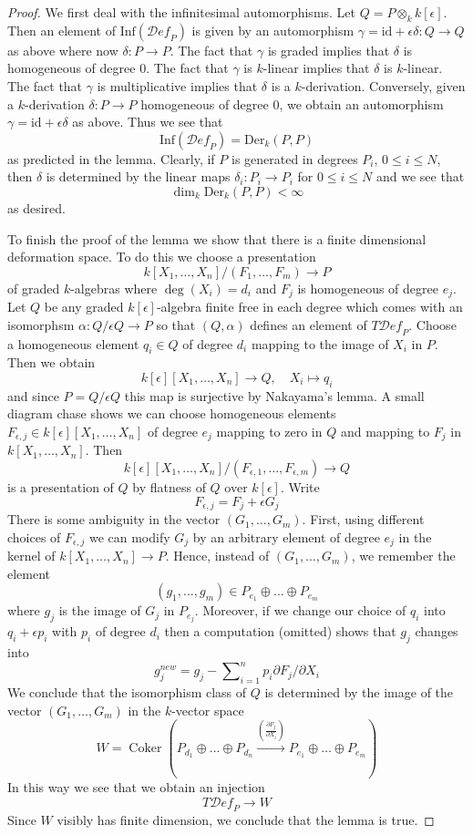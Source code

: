\documentclass[10pt,a4paper]{amsart}
\theoremstyle{plain}
\theoremstyle{definition}
\theoremstyle{remark}
\numberwithin{equation}{subsection}
\def\Coker{\mathop{\mathrm{Coker}}}
\def\Deformationcategory{\mathcal{D}\!\mathit{ef}}
\begin{document}
\begin{proof}
We first deal with the infinitesimal automorphisms.
Let $Q = P \otimes_k k[\epsilon]$.
Then an element of $\text{Inf}(\Deformationcategory_P)$
is given by an automorphism
$\gamma = \text{id} + \epsilon \delta : Q \to Q$
as above where now $\delta : P \to P$.
The fact that $\gamma$ is graded implies that
$\delta$ is homogeneous of degree $0$.
The fact that $\gamma$ is $k$-linear implies that
$\delta$ is $k$-linear.
The fact that $\gamma$ is multiplicative implies that
$\delta$ is a $k$-derivation.
Conversely, given a $k$-derivation $\delta : P \to P$
homogeneous of degree $0$, we obtain an automorphism
$\gamma = \text{id} + \epsilon \delta$ as above.
Thus we see that
$$
\text{Inf}(\Deformationcategory_P) = \text{Der}_k(P, P)
$$
as predicted in the lemma.
Clearly, if $P$ is generated in degrees $P_i$,
$0 \leq i \leq N$, then $\delta$ is determined by
the linear maps $\delta_i : P_i \to P_i$ for
$0 \leq i \leq N$ and we see that
$$
\dim_k \text{Der}_k(P, P) < \infty
$$
as desired.

\medskip\noindent
To finish the proof of the lemma we show that there is a finite
dimensional deformation space. To do this we
choose a presentation
$$
k[X_1, \ldots, X_n]/(F_1, \ldots, F_m) \longrightarrow P
$$
of graded $k$-algebras where $\deg(X_i) = d_i$ and
$F_j$ is homogeneous of degree $e_j$.
Let $Q$ be any graded $k[\epsilon]$-algebra
finite free in each degree which comes with an isomorphsm
$\alpha : Q/\epsilon Q \to P$ so that $(Q, \alpha)$ defines
an element of $T\Deformationcategory_P$.
Choose a homogeneous element $q_i \in Q$ of degree $d_i$
mapping to the image of $X_i$ in $P$.
Then we obtain
$$
k[\epsilon][X_1, \ldots, X_n] \longrightarrow Q,\quad
X_i \longmapsto q_i
$$
and since $P = Q/\epsilon Q$ this map is surjective by Nakayama's lemma.
A small diagram chase shows we can choose homogeneous elements
$F_{\epsilon, j} \in k[\epsilon][X_1, \ldots, X_n]$ of degree $e_j$
mapping to zero in $Q$ and mapping to $F_j$ in $k[X_1, \ldots, X_n]$.
Then
$$
k[\epsilon][X_1, \ldots, X_n]/(F_{\epsilon, 1}, \ldots, F_{\epsilon, m})
\longrightarrow Q
$$
is a presentation of $Q$ by flatness of $Q$ over $k[\epsilon]$.
Write
$$
F_{\epsilon, j} =  F_j + \epsilon G_j
$$
There is some ambiguity in the vector $(G_1, \ldots, G_m)$.
First, using different choices of $F_{\epsilon, j}$
we can modify $G_j$ by an arbitrary element of degree $e_j$
in the kernel of $k[X_1, \ldots, X_n] \to P$.
Hence, instead of $(G_1, \ldots, G_m)$, we remember the
element
$$
(g_1, \ldots, g_m) \in P_{e_1} \oplus \ldots \oplus P_{e_m}
$$
where $g_j$ is the image of $G_j$ in $P_{e_j}$.
Moreover, if we change our choice of $q_i$ into $q_i + \epsilon p_i$
with $p_i$ of degree $d_i$ then a computation (omitted) shows
that $g_j$ changes into
$$
g_j^{new} = g_j - \sum\nolimits_{i = 1}^n p_i \partial F_j / \partial X_i
$$
We conclude that the isomorphism class of $Q$ is determined by the
image of the vector $(G_1, \ldots, G_m)$ in the $k$-vector space
$$
W  = \Coker(P_{d_1} \oplus \ldots \oplus P_{d_n}
\xrightarrow{(\frac{\partial F_j}{\partial X_i})}
P_{e_1} \oplus \ldots \oplus P_{e_m})
$$
In this way we see that we obtain an injection
$$
T\Deformationcategory_P \longrightarrow W
$$
Since $W$ visibly has finite dimension, we conclude that the lemma is true.
\end{proof}
\end{document}

